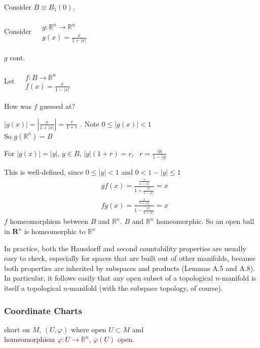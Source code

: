 Consider $B \equiv B_1(0)$.  

Consider $\begin{aligned} & \quad \\ 
  & g: \mathbb{R}^n \to \mathbb{R}^n \\
  & g(x) = \frac{x}{ 1 + |x| } \end{aligned}$ 

$g$ cont.  

Let $\begin{aligned} & \quad \\
  & f:B \to \mathbb{R}^n \\
  & f(x) = \frac{x}{ 1 - |x| } \end{aligned} $ 

How was $f$ guessed at?

$|g(x) | = \left| \frac{x}{1 + |x| } \right| = \frac{r}{ 1 + r}$ .  Note $0 \leq |g(x) | <1$ \\
So $g(\mathbb{R}^n) = B$

For $|g(x)| = |y|$, $y \in B$, $|y|(1+r) = r$, \, $r = \frac{ |y| }{ 1 - |y| }$

This is well-defined, since $0 \leq |y| < 1$ and $0 < 1 - |y| \leq 1$
\[
\begin{aligned}
  & gf(x) =\frac{  \frac{ x}{ 1 - |x| } }{ 1 + \frac{|x|}{ 1 - |x| } } = x \\ 
  & fg(x) = \frac{ \frac{x}{ 1 + |x| } }{ 1 - \frac{|x| }{ 1 + |x| } } = x
\end{aligned}
\]
$f$ homeomorphism between $B$ and $\mathbb{R}^n$.  $B$ and $\mathbb{R}^n$ homeomorphic.  So an open ball in $\mathbf{R}^n$ is homeomorphic to $\mathbb{R}^n$

\hrulefill

In practice, both the Hausdorff and second countability properties are usually easy to check, especially for spaces that are built out of other manifolds, because both properties are inherited by subspaces and products (Lemmas A.5 and A.8).  In particular, it follows easily that any open subset of a topological $n$-manifold is itself a topological $n$-manifold (with the subspace topology, of course).  

\subsubsection*{Coordinate Charts}

chart on $M$, $(U, \varphi)$ where open $U \subset M$ and \\
homeomorphism $\varphi : U \to \mathbb{R}^n$, $\varphi(U)$ open.  






